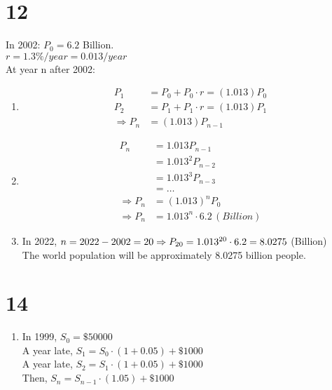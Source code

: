 \documentclass[12pt]{article}
\begin{document}
\begin{multicols}{2}
      \section*{12}
        In 2002: \(P_0=6.2\) Billion. \\
        \(r = 1.3\%/year = 0.013/year\) \\
        At year n after 2002:
        \begin{enumerate}[label=\alph*)]
          \item %
          \begin{align*}
            P_1 &= P_0 + P_0\cdot r = (1.013)P_0 \\
            P_2 &= P_1 + P_1\cdot r = (1.013)P_1 \\
            \Rightarrow P_n &= (1.013)P_{n-1}
          \end{align*}

          \item %
          \begin{align*}
            P_n &= 1.013P_{n-1} \\
            &=1.013^2P_{n-2} \\
            &=1.013^3P_{n-3} \\
            &=\dots \\
            \Rightarrow P_n &= (1.013)^n P_0 \\
            \Rightarrow P_n &= 1.013^n\cdot 6.2 \, (Billion)
          \end{align*}

          \item %
          In 2022, \(n = 2022-2002=20\\
          \Rightarrow P_{20}=1.013^{20}\cdot 6.2= 8.0275\) (Billion) \\
          The world population will be approximately 8.0275 billion people.
        \end{enumerate}

      \section*{14}
        \begin{enumerate}[label=\alph*)]
          \item %
            In 1999, \(S_0=\$50000\)\\
            A year late, \(S_1=S_0\cdot(1+0.05) + \$1000\)\\
            A year late, \(S_2=S_1\cdot(1+0.05) + \$1000\)\\
            Then, \(S_n=S_{n-1}\cdot(1.05) + \$1000\)


\end{enumerate}
\end{multicols}
\end{document}
